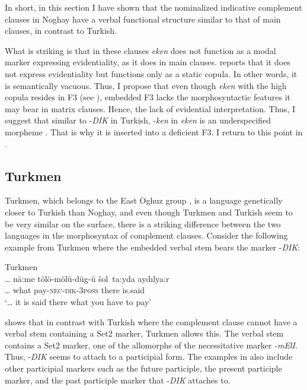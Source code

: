 \documentclass[output=paper]{langsci/langscibook}
\begin{document}
In short, in this section I have shown that the nominalized indicative complement clauses in Noghay have a verbal functional structure similar to that of main clauses, in contrast to Turkish. 

What is striking is that in these clauses \textit{eken} does not function as a modal marker expressing evidentiality, as it does in main clauses. 
\citet{Karakoc2001} reports that it does not express evidentiality but functions only as a static copula. 
In other words, it is semantically vacuous. 
Thus, I propose that even though \textit{eken} with the high copula resides in F3 (see ), embedded F3 lacks the morphosyntactic features it may bear in matrix clauses. 
Hence, the lack of evidential interpretation. 
Thus, I suggest that similar to -\textit{DIK} in Turkish, -\textit{ken} in \textit{eken} is an underspecified morpheme \citep{Kelepir2015}. 
That is why it is inserted into a deficient F3. 
I return to this point in .

\subsection{Turkmen}
\label{kelepirsec:key:2.4}

Turkmen, which belongs to the East Oghuz group \citep{Schonig1998,Johanson1998}, is a language genetically closer to Turkish than Noghay, and even though Turkmen and Turkish seem to be very similar on the surface, there is a striking difference between the two languages in the morphosyntax of complement clauses. 
Consider the following example from Turkmen where the embedded verbal stem bears the marker -\textit{DIK}:     

\ea Turkmen\\%
    \label{kelepirex:key:21}
    \gll \ldots{} nä:me tölö-mölü-düg-ü šol~ta:yda aydılya:r \\
    \ldots{} what pay-\textsc{nec}-\textsc{dik}-\textsc{3poss} there is.said \\
    \glt `\ldots{} it is said there what you have to pay' 
    \z

 shows that in contrast with Turkish where the complement clause cannot have a verbal stem containing a Set2 marker, Turkmen allows this. 
The verbal stem contains a Set2 marker, one of the allomorphs of the necessitative marker \textit{-mElI}. 
Thus, -\textit{DIK} seems to attach to a participial form. 
The examples in \citet[480--483]{Clark1998} also include other participial markers such as the future participle, the present participle marker, and the past participle marker that -\textit{DIK} attaches to.
\end{document}
